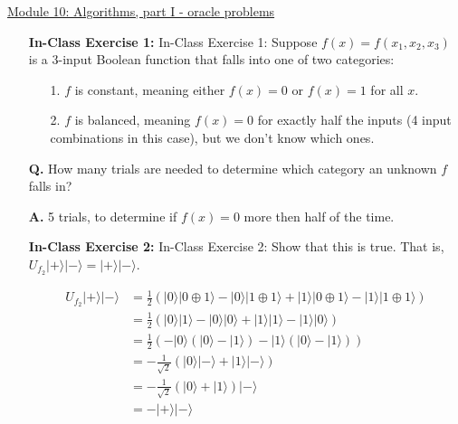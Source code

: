 \documentclass[main.tex]{subfiles}
\begin{document}
\href{https://www2.seas.gwu.edu/~simhaweb/quantum/modules/module10/module10.html}{Module 10: Algorithms, part I - oracle problems}

\begin{enumerate}

\item[] \textbf{In-Class Exercise 1:} In-Class Exercise 1: Suppose $f(x)=f\left(x_{1}, x_{2}, x_{3}\right)$ is a 3-input Boolean function that falls into one of two categories:
\begin{enumerate}
    \item [1.] $f$ is constant, meaning either $f(x)=0$ or $f(x)=1$ for all $x$.
    \item [2.] $f$ is balanced, meaning $f(x)=0$ for exactly half the inputs (4 input combinations in this case), but we don't know which ones. 
\end{enumerate}
\textbf{Q.} How many trials are needed to determine which category an unknown $f$ falls in? 

    \textbf{A.} 5 trials, to determine if $f(x)=0$ more then half of the time.

\item[] \textbf{In-Class Exercise 2:} In-Class Exercise 2: Show that this is true. That is, $U_{f_{2}}|+\rangle|-\rangle=|+\rangle|-\rangle$.

    \begin{align*}
        U_{f_{2}}|+\rangle|-\rangle & = \frac{1}{2}(|0\rangle|0 \oplus 1\rangle
                                    -|0\rangle|1 \oplus 1\rangle
                                    +|1\rangle|0 \oplus 1\rangle
                                    -|1\rangle|1 \oplus 1\rangle) \\
                                    & = \frac{1}{2}(|0\rangle|1\rangle
                                    -|0\rangle|0\rangle
                                    +|1\rangle|1\rangle
                                    -|1\rangle|0\rangle) \\
                                    &=\frac{1}{2}(-|0\rangle(|0\rangle-|1\rangle)
                                    -|1\rangle(|0\rangle-|1\rangle)) \\
                                    &=-\frac{1}{\sqrt{2}}(|0\rangle|-\rangle+|1\rangle|-\rangle) \\
                                    &=-\frac{1}{\sqrt{2}}(|0\rangle+|1\rangle)|-\rangle \\
                                    &=-|+\rangle|-\rangle \tag{cannot remove -}
    \end{align*}   
    

\end{enumerate}
\end{document}
